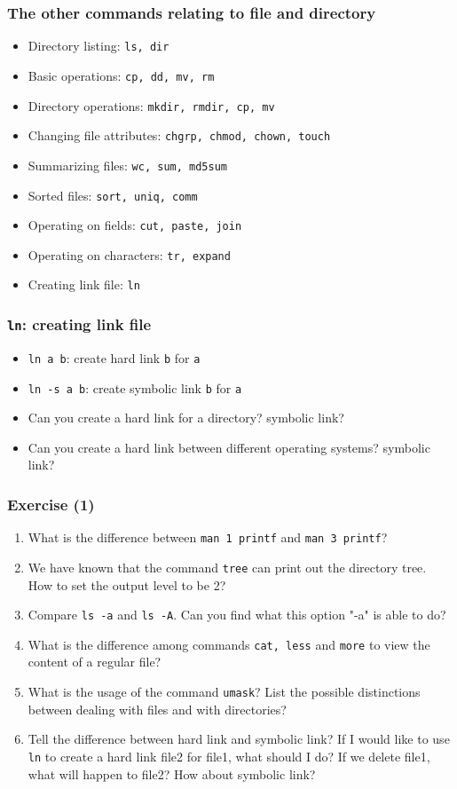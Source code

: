 \documentclass[red]{beamer}
\begin{document}
\begin{CJK*}{UTF8}{gbsn}
\begin{frame}[containsverbatim]
\frametitle{The other commands relating to file and directory}
\begin{itemize}
	\item Directory listing: \lstinline{ls, dir}
	\item Basic operations: \lstinline{cp, dd, mv, rm}
	\item Directory operations: \lstinline{mkdir, rmdir, cp, mv}
	\item Changing file attributes: \lstinline{chgrp, chmod, chown, touch}
	\item Summarizing files: \lstinline{wc, sum, md5sum}
	\item Sorted files: \lstinline{sort, uniq, comm}
	\item Operating on fields: \lstinline{cut, paste, join}
	\item Operating on characters: \lstinline{tr, expand}
	\item Creating link file: \lstinline{ln}
\end{itemize}
\end{frame}


\begin{frame}[containsverbatim]
\frametitle{\texttt{ln}: creating link file}
\begin{itemize}
	\item \lstinline{ln a b}: create hard link \texttt{b} for \texttt{a}
	\item \lstinline{ln -s a b}: create symbolic link \texttt{b} for \texttt{a}
	\item Can you create a hard link for a directory? symbolic link?
	\item Can you create a hard link between different operating systems? symbolic link?
\end{itemize}
\end{frame}

\begin{frame}[containsverbatim]
\frametitle{Exercise (1)}
\begin{enumerate}
	\item What is the difference between \lstinline{man 1 printf} and 
			\lstinline{man 3 printf}?
	\item We have known that the command \lstinline{tree} can print out 
		the directory tree. How to set the output level to be 2?
	\item Compare \lstinline{ls -a} and \lstinline{ls -A}. Can you find 
		what this option "-a" is able to do?
	\item What is the difference among commands \lstinline{cat, less} and
		\lstinline{more} to view the content of a regular file?
	\item What is the usage of the command \lstinline{umask}? List the
		possible distinctions between dealing with files and with 
		directories?
	\item Tell the difference between hard link and symbolic link? If I
			would like to use \lstinline{ln} to create a hard link file2 for
			file1, what should I do? If we delete file1, what will happen 
			to file2? How about symbolic link?
\end{enumerate}
\end{frame}


\end{CJK*}
\end{document}
